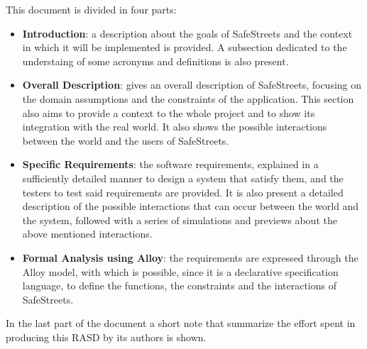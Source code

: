 This document is divided in four parts:
\begin{itemize}
	\item \textbf{Introduction}: a description about the goals of SafeStreets and the context in which it will be implemented is provided. A subsection dedicated to the understaing of some acronyms and definitions is also present. 
	
	\item \textbf{Overall Description}: gives an overall description of SafeStreets, focusing on the domain assumptions and the constraints of the application. This section also aims to provide a context to the whole project and to show its integration with the real world. It also shows the possible interactions between the world and the users of SafeStreets. 
	
	\item \textbf{Specific Requirements}: the software requirements, explained in a sufficiently detailed manner to design a system that satisfy them, and the testers to test said requirements are provided. It is also present a detailed description of the possible interactions that can occur between the world and the system, followed with a series of simulations and previews about the above mentioned interactions.
	
	\item \textbf{Formal Analysis using Alloy}: the requirements are expressed through the Alloy model, with which is possible, since it is a declarative specification language, to define the functions, the constraints and the interactions of SafeStreets.   
\end{itemize}
In the last part of the document a short note that summarize the effort spent in producing this RASD by its authors is shown.